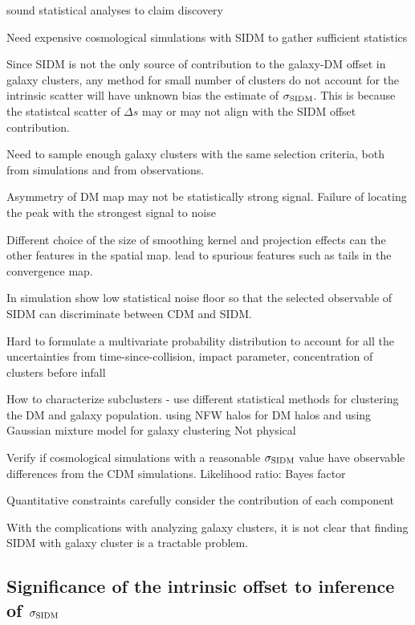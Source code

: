 sound statistical analyses to claim discovery  

Need expensive cosmological simulations with SIDM to gather sufficient statistics 


Since SIDM is not the only source of contribution to the galaxy-DM offset 
in galaxy clusters,
any method for small number of clusters do not account for the intrinsic 
scatter will have unknown bias the estimate of $\sigma_{\rm SIDM}$. 
This is because the statistcal scatter of $\Delta s$ may or may 
not align with the SIDM offset contribution. 

Need to sample enough galaxy clusters with the same selection criteria, 
both from simulations and from observations.

Asymmetry of DM map may not be statistically strong signal.
Failure of locating the peak with the strongest signal to noise 


Different choice of the size of smoothing kernel and projection effects can the
other features in the spatial map.
lead to spurious features such as tails in the convergence map.

In simulation 
show low statistical noise floor so that 
the selected observable of SIDM can discriminate between CDM and SIDM.   

Hard to formulate a multivariate probability distribution to account for all
the uncertainties from 
time-since-collision, impact parameter, concentration of clusters before infall

How to characterize subclusters - 
use different statistical methods for clustering the DM and galaxy 
population. 
using NFW halos for DM halos and using
Gaussian mixture model for galaxy clustering  
Not physical


Verify if cosmological simulations with a reasonable $\sigma_{\rm SIDM}$ value 
have observable differences from the CDM simulations. 
Likelihood ratio: Bayes factor 

Quantitative constraints carefully consider the contribution of each component

With the complications with analyzing galaxy clusters, 
it is not clear that finding SIDM with galaxy cluster is a tractable problem. 


\subsection{Significance of the intrinsic offset to inference of $\sigma_{\rm
SIDM}$}





